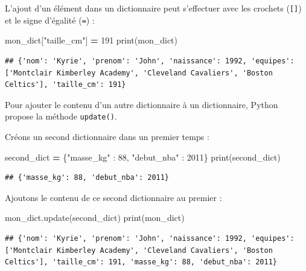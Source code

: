 \documentclass[
  12pt,
]{book}
\newenvironment{Shaded}{\begin{snugshade}}{\end{snugshade}}
\newcommand{\BuiltInTok}[1]{#1}
\newcommand{\DecValTok}[1]{\textcolor[rgb]{0.00,0.00,0.81}{#1}}
\newcommand{\NormalTok}[1]{#1}
\newcommand{\OperatorTok}[1]{\textcolor[rgb]{0.81,0.36,0.00}{\textbf{#1}}}
\newcommand{\StringTok}[1]{\textcolor[rgb]{0.31,0.60,0.02}{#1}}
\numberwithin{equation}{section}
\numberwithin{countremarque}{section}
\begin{document}
L'ajout d'un élément dans un dictionnaire peut s'effectuer avec les crochets (\texttt{{[}{]}}) et le signe d'égalité (\texttt{=}) :

\begin{Shaded}
\begin{Highlighting}[]
\NormalTok{mon\_dict[}\StringTok{"taille\_cm"}\NormalTok{] }\OperatorTok{=} \DecValTok{191}
\BuiltInTok{print}\NormalTok{(mon\_dict)}
\end{Highlighting}
\end{Shaded}

\begin{lstlisting}
## {'nom': 'Kyrie', 'prenom': 'John', 'naissance': 1992, 'equipes': ['Montclair Kimberley Academy', 'Cleveland Cavaliers', 'Boston Celtics'], 'taille_cm': 191}
\end{lstlisting}

Pour ajouter le contenu d'un autre dictionnaire à un dictionnaire, Python propose la méthode \texttt{update()}.

Créons un second dictionnaire dans un premier temps :

\begin{Shaded}
\begin{Highlighting}[]
\NormalTok{second\_dict }\OperatorTok{=}\NormalTok{ \{}\StringTok{"masse\_kg"}\NormalTok{ : }\DecValTok{88}\NormalTok{, }\StringTok{"debut\_nba"}\NormalTok{ : }\DecValTok{2011}\NormalTok{\}}
\BuiltInTok{print}\NormalTok{(second\_dict)}
\end{Highlighting}
\end{Shaded}

\begin{lstlisting}
## {'masse_kg': 88, 'debut_nba': 2011}
\end{lstlisting}

Ajoutons le contenu de ce second dictionnaire au premier :

\begin{Shaded}
\begin{Highlighting}[]
\NormalTok{mon\_dict.update(second\_dict)}
\BuiltInTok{print}\NormalTok{(mon\_dict)}
\end{Highlighting}
\end{Shaded}

\begin{lstlisting}
## {'nom': 'Kyrie', 'prenom': 'John', 'naissance': 1992, 'equipes': ['Montclair Kimberley Academy', 'Cleveland Cavaliers', 'Boston Celtics'], 'taille_cm': 191, 'masse_kg': 88, 'debut_nba': 2011}
\end{lstlisting}
\end{document}
